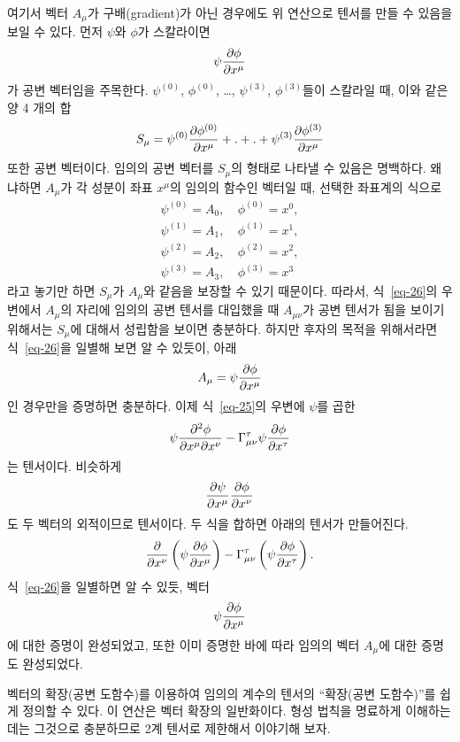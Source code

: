 \documentclass[b5paper]{article}
\begin{document}
여기서 벡터 $A_\mu$가 구배(gradient)가 아닌 경우에도 위 연산으로 텐서를 만들 수 있음을 보일 수 있다. 먼저 $\psi$와 $\phi$가 스칼라이면 
\[\psi{\frac{{\partial}{\phi}}{{\partial}{x^\mu}}}\]
가 공변 벡터임을 주목한다. $\psi^{(0)}$, $\phi^{(0)}$, \dots, $\psi^{(3)}$, $\phi^{(3)}$들이 스칼라일 때, 이와 같은 양 4 개의 합
\[S_\mu=\psi^{(0)}{\frac{{\partial}{\phi^{(0)}}}{{\partial}{x^\mu}}} 
		+ . 
		+ . 
		+\psi^{(3)}{\frac{{\partial}{\phi^{(3)}}}{{\partial}{x^\mu}}} \]
또한 공변 벡터이다. 임의의 공변 벡터를 $S_\mu$의 형태로 나타낼 수 있음은 명백하다. 왜냐하면 $A_\mu$가 각 성분이 좌표 $x^\mu$의 임의의 함수인 벡터일 때, 선택한 좌표계의 식으로
\begin{align*}
\psi^{(0)}=A_0,~ & \phi^{(0)}=x^0, \\
\psi^{(1)}=A_1,~ & \phi^{(1)}=x^1, \\
\psi^{(2)}=A_2,~ & \phi^{(2)}=x^2, \\
\psi^{(3)}=A_3,~ & \phi^{(3)}=x^3
\end{align*}
라고 놓기만 하면 $S_\mu$가 $A_\mu$와 같음을 보장할 수 있기 때문이다.
따라서, 식~\eqref{eq-26}의 우변에서 $A_\mu$의 자리에 임의의 공변 텐서를 대입했을 때 $A_{\mu\nu}$가 공변 텐서가 됨을 보이기 위해서는 $ S_\mu $에 대해서 성립함을 보이면 충분하다. 하지만 후자의 목적을 위해서라면 식~\eqref{eq-26}을 일별해 보면 알 수 있듯이, 아래
\begin{equation*}
A_\mu=\psi{\frac{{\partial}{\phi}}{{\partial}{x^\mu}}}
\end{equation*}
인 경우만을 증명하면 충분하다.
이제 식~\eqref{eq-25}의 우변에 $\psi$를 곱한
\begin{equation*}
\psi{\frac{{\partial^2}{\phi}}{{\partial}{x^\mu}{\partial}{x^\nu}}}  
- \Gamma_{\mu\nu}^\tau \psi{\frac{{\partial}{\phi}}{{\partial}{x^\tau}}}
\end{equation*} 
는 텐서이다. 비슷하게
\[{\frac{{\partial}{\psi}}{{\partial}{x^\mu}}}{\frac{{\partial}{\phi}}{{\partial}{x^\nu}}}\]
도 두 벡터의 외적이므로 텐서이다. 두 식을 합하면 아래의 텐서가 만들어진다.
\begin{equation*}
	{\frac{{\partial}{}}{{\partial}{x^\nu}}}\left(\psi{\frac{{\partial}{\phi}}{{\partial}{x^\mu}}}\right)
	- \Gamma_{\mu\nu}^{\tau}\left(\psi{\frac{{\partial}{\phi}}{{\partial}{x^\tau}}}\right).
\end{equation*}
식~\eqref{eq-26}을 일별하면 알 수 있듯, 벡터 \[\psi{\frac{{\partial}{\phi}}{{\partial}{x^\mu}}} \]에 대한 증명이 완성되었고, 또한 이미 증명한 바에 따라 임의의 벡터 $A_\mu$에 대한 증명도 완성되었다.

벡터의 확장(공변 도함수)를 이용하여 임의의 계수의 텐서의 ``확장(공변 도함수)''를 쉽게 정의할 수 있다. 이 연산은 벡터 확장의 일반화이다.  형성 법칙을 명료하게 이해하는 데는 그것으로 충분하므로 2계 텐서로 제한해서 이야기해 보자.
\end{document}
